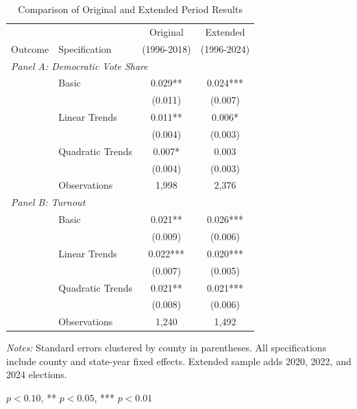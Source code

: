 \begin{table}[htbp]
\centering
\caption{Comparison of Original and Extended Period Results}
\label{tab:extension}
\begin{tabular}{llcc}
\toprule
& & Original & Extended \\
Outcome & Specification & (1996-2018) & (1996-2024) \\
\midrule
\multicolumn{4}{l}{\textit{Panel A: Democratic Vote Share}} \\[0.5em]
& Basic & 0.029** & 0.024*** \\
& & (0.011) & (0.007) \\
& Linear Trends & 0.011** & 0.006* \\
& & (0.004) & (0.003) \\
& Quadratic Trends & 0.007* & 0.003 \\
& & (0.004) & (0.003) \\
& Observations & 1,998 & 2,376 \\[0.5em]
\multicolumn{4}{l}{\textit{Panel B: Turnout}} \\[0.5em]
& Basic & 0.021** & 0.026*** \\
& & (0.009) & (0.006) \\
& Linear Trends & 0.022*** & 0.020*** \\
& & (0.007) & (0.005) \\
& Quadratic Trends & 0.021** & 0.021*** \\
& & (0.008) & (0.006) \\
& Observations & 1,240 & 1,492 \\
\bottomrule
\end{tabular}
\begin{tablenotes}
\small
\item \textit{Notes:} Standard errors clustered by county in parentheses. All specifications include county and state-year fixed effects. Extended sample adds 2020, 2022, and 2024 elections.
\item * $p<0.10$, ** $p<0.05$, *** $p<0.01$
\end{tablenotes}
\end{table}


